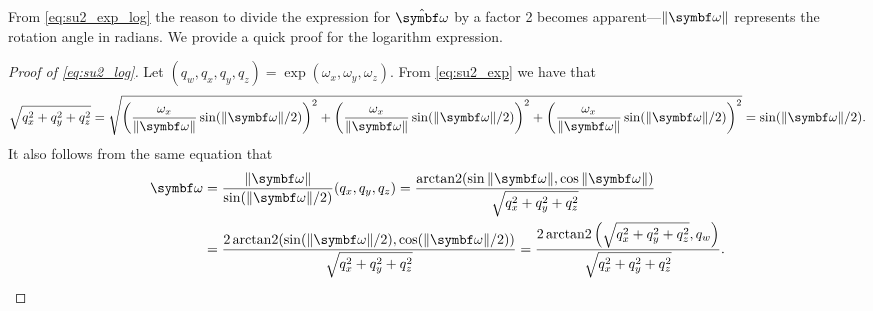 From \eqref{eq:su2_exp_log} the reason to divide the expression for $\hat \bomega$ by a factor 2  becomes apparent---$\| \bomega \|$ represents the rotation angle in radians. We provide a quick proof for the logarithm expression.
\begin{proof}[Proof of \eqref{eq:su2_log}]
  Let $(q_w, q_x, q_y, q_z) = \exp(\omega_x, \omega_y, \omega_z)$. From \eqref{eq:su2_exp} we have that
  \begin{equation}
    \sqrt{q_x^2 + q_y^2 + q_z^2} = \sqrt{ \left( \frac{\omega_x}{\| \bomega \| } \sin ( \| \bomega \| / 2) \right)^2 + \left( \frac{\omega_x}{\| \bomega \| } \sin ( \| \bomega \| / 2) \right)^2 + \left( \frac{\omega_x}{\| \bomega \| } \sin ( \| \bomega \| / 2) \right)^2 } = \sin (\| \bomega \| / 2).
  \end{equation}
  It also follows from the same equation that
  \begin{equation}
    \begin{aligned}
      \bomega & = \frac{\|\bomega\|}{\sin(\| \bomega \| / 2)}(q_x, q_y, q_z)
      = \frac{\arctantwo(\sin \| \bomega \| , \cos \| \bomega \| )}{\sqrt{q_x^2 + q_y^2 + q_z^2}}                       \\
              & = \frac{2 \arctantwo(\sin (\| \bomega \| / 2), \cos (\| \bomega \| / 2))}{\sqrt{q_x^2 + q_y^2 + q_z^2}}
      = \frac{2 \arctantwo\left( \sqrt{q_x^2 + q_y^2 + q_z^2}, q_w \right)}{\sqrt{q_x^2 + q_y^2 + q_z^2}}.
    \end{aligned}
  \end{equation}
\end{proof}

